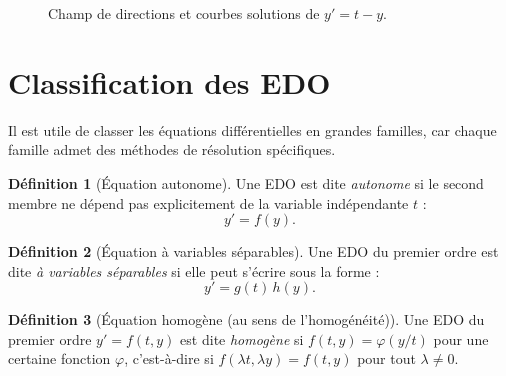\documentclass[12pt,a4paper,openany]{book}
\theoremstyle{definition}
\newtheorem{definition}{Définition}[chapter]
\theoremstyle{plain}
\theoremstyle{remark}
\begin{document}
\begin{figure}[ht]
\centering
{}
\caption{Champ de directions et courbes solutions de $y' = t - y$.}
\label{fig:champ-t-y}
\end{figure}

\section{Classification des EDO}
\label{sec:classification}

Il est utile de classer les équations différentielles en grandes familles, car chaque famille admet des méthodes de résolution spécifiques.

\begin{definition}[Équation autonome]
\label{def:autonome}
Une EDO est dite \emph{autonome} si le second membre ne dépend pas explicitement de la variable indépendante $t$ :
\[
y' = f(y).
\]
\end{definition}

\begin{definition}[Équation à variables séparables]
\label{def:separable}
Une EDO du premier ordre est dite \emph{à variables séparables} si elle peut s'écrire sous la forme :
\[
y' = g(t)\,h(y).
\]
\end{definition}

\begin{definition}[Équation homogène (au sens de l'homogénéité)]
\label{def:homogene-sens-homogeneite}
Une EDO du premier ordre $y' = f(t,y)$ est dite \emph{homogène} si $f(t,y) = \varphi(y/t)$ pour une certaine fonction $\varphi$, c'est-à-dire si $f(\lambda t, \lambda y) = f(t,y)$ pour tout $\lambda \neq 0$.
\end{definition}
\end{document}
